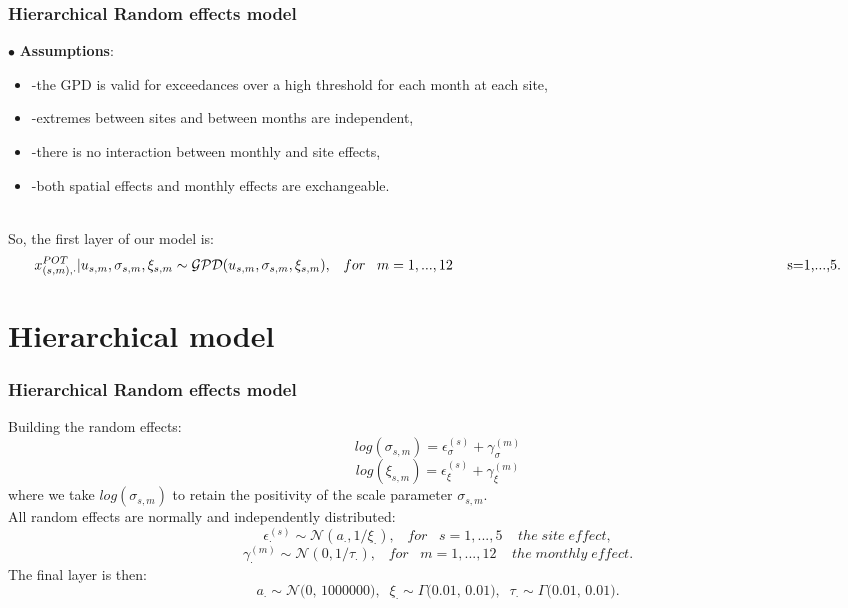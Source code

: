 \documentclass[usenames,dvipsnames]{beamer}
\begin{document}
\begin{frame}
\frametitle{Hierarchical Random effects model}
\small
$\bullet$ \textbf{Assumptions}:
\begin{itemize}
    \item -the GPD is valid for exceedances over a high threshold for
each month at each site,
    \item -extremes between sites and between months are independent,
    \item -there is no interaction between monthly and site effects, 
    \item -both spatial effects and monthly effects are exchangeable.
\end{itemize}
\\
\vspace{10pt}
So, the first layer of our model is:
\begin{equation*}
    x_{(s,m),\cdot}^{POT}|u_{s,m},\sigma_{s,m},\xi_{s,m} \sim \mathcal{GPD}(u_{s,m},\sigma_{s,m},\xi_{s,m}), \;\;\; for \;\;\; m=1,...,12 \;\;\; \\ \hspace{220pt} \;\;\;\;\; $s=1,...,5$.
\end{equation*}   

\end{frame}
\section{Hierarchical model}

\begin{frame}
\frametitle{Hierarchical Random effects model}
\small
Building the random effects:
\begin{equation*}
    log(\sigma_{s,m})= \epsilon_{\sigma}^{(s)}  + \gamma_{\sigma}^{(m)}
\end{equation*}
\begin{equation*}
    log(\xi_{s,m})= \epsilon_{\xi}^{(s)}  + \gamma_{\xi}^{(m)}
\end{equation*}
where we take $log(\sigma_{s,m})$ to retain the positivity of the scale parameter $\sigma_{s,m}$.\\

All random effects are normally and independently distributed:
\begin{equation*}
    \epsilon_{\cdot}^{(s)} \sim \mathcal{N}\textit{$(a_{\cdot}, 1/\xi_{\cdot})$}, \;\;\; for \;\;\; s=1,...,5 \;\;\; \; the \;  site\;  effect,
\end{equation*}
\begin{equation*}
    \gamma_{\cdot}^{(m)} \sim \mathcal{N}\textit{$(0, 1/\tau_{\cdot})$}, \;\;\; for \;\;\; m=1,...,12 \;\;\; \; the \;  monthly\;  effect.
\end{equation*}
The final layer is then: %
\begin{equation*}
    a_{\cdot} \sim \mathcal{N}\textit{(0, 1000000)}, \;\;\xi_{\cdot}\sim \Gamma\textit{(0.01, 0.01)}, \;\; \tau_{\cdot}\sim \Gamma\textit{(0.01, 0.01)}.
\end{equation*}
\end{frame}
\end{document}
